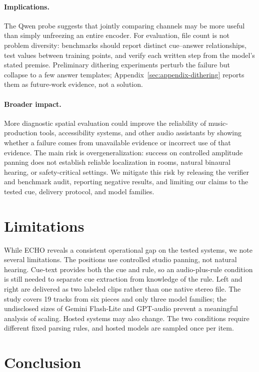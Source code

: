 \documentclass{article}
\begin{document}
\paragraph{Implications.} The Qwen probe suggests that jointly comparing channels may be more useful than simply unfreezing an entire encoder. For evaluation, file count is not problem diversity: benchmarks should report distinct cue--answer relationships, test values between training points, and verify each written step from the model's stated premise. Preliminary dithering experiments perturb the failure but collapse to a few answer templates; Appendix~\ref{sec:appendix-dithering} reports them as future-work evidence, not a solution.

\paragraph{Broader impact.} More diagnostic spatial evaluation could improve the reliability of music-production tools, accessibility systems, and other audio assistants by showing whether a failure comes from unavailable evidence or incorrect use of that evidence. The main risk is overgeneralization: success on controlled amplitude panning does not establish reliable localization in rooms, natural binaural hearing, or safety-critical settings. We mitigate this risk by releasing the verifier and benchmark audit, reporting negative results, and limiting our claims to the tested cue, delivery protocol, and model families.

\section{Limitations}
\label{sec:limitations}

While ECHO reveals a consistent operational gap on the tested systems, we note several limitations. The positions use controlled studio panning, not natural hearing. Cue-text provides both the cue and rule, so an audio-plus-rule condition is still needed to separate cue extraction from knowledge of the rule. Left and right are delivered as two labeled clips rather than one native stereo file. The study covers 19 tracks from six pieces and only three model families; the undisclosed sizes of Gemini Flash-Lite and GPT-audio prevent a meaningful analysis of scaling. Hosted systems may also change. The two conditions require different fixed parsing rules, and hosted models are sampled once per item.

\section{Conclusion}
\end{document}
